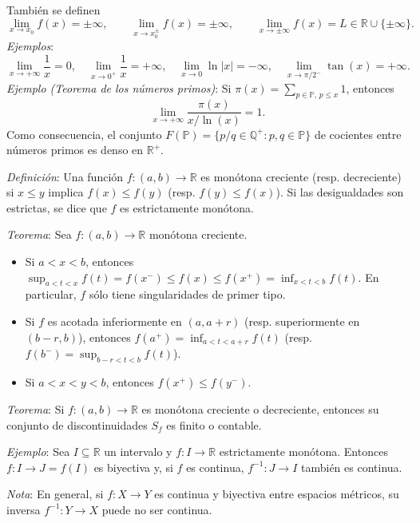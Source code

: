 \documentclass{beamer}
\begin{document}
  \begin{frame}
    También se definen
    \[
      \lim_{x \to x_0} f(x) = \pm\infty, \qquad \lim_{x \to x_0^{\pm}} f(x) = \pm\infty, 
      \qquad \lim_{x \to \pm\infty} f(x) = L \in \mathbb{R} \cup \{\pm\infty\}.
    \]
    \pause
    \textit{Ejemplos}:
    \[
      \lim_{x \to +\infty} \frac{1}{x} = 0, \quad \lim_{x \to 0^+} \frac{1}{x} = +\infty, 
      \quad \lim_{x \to 0} \ln|x| = -\infty, \quad \lim_{x \to \pi/2^-} \tan(x) = +\infty.
    \]
    \pause
    \textit{Ejemplo (Teorema de los números primos)}: Si 
    $\pi(x) = \sum_{p \in \mathbb{P}, \, p \leq x} 1$, entonces
    \[
      \lim_{x \to +\infty} \frac{\pi(x)}{x / \ln(x)} = 1.
    \]
    Como consecuencia, el conjunto $F(\mathbb{P}) = \{p/q \in \mathbb{Q}^+ : p, q \in \mathbb{P}\}$ 
    de cocientes entre números primos es denso en $\mathbb{R}^+$.
  \end{frame}

  \begin{frame}
    \textit{Definición}: Una función $f: (a, b) \to \mathbb{R}$ es monótona creciente 
    (resp. decreciente) si $x \leq y$ implica $f(x) \leq f(y)$ (resp. $f(y) \leq f(x)$). 
    Si las desigualdades son estrictas, se dice que $f$ es estrictamente monótona.
    \newline\newline
    \pause

    \textit{Teorema}: Sea $f: (a, b) \to \mathbb{R}$ monótona creciente.
    \pause
    \begin{itemize}[<+->]
      \item Si $a < x < b$, entonces
      $\displaystyle\sup_{a < t < x} f(t) = f(x^-) \leq f(x) \leq f(x^+) = \inf_{x < t < b} f(t)$. 
      En particular, $f$ sólo tiene singularidades de primer tipo.
      \item Si $f$ es acotada inferiormente en $(a, a + r)$ (resp. superiormente en 
      $(b - r, b)$), entonces $f(a^+) = \inf_{a < t < a + r} f(t)$ (resp. 
      $f(b^-) = \sup_{b - r < t < b} f(t)$).
      \item Si $a < x < y < b$, entonces $f(x^+) \leq f(y^-)$.
    \end{itemize}
  \end{frame}

  \begin{frame}
    \textit{Teorema}: Si $f: (a, b) \to \mathbb{R}$ es monótona creciente o decreciente, 
    entonces su conjunto de discontinuidades $S_f$ es finito o contable.
    \newline\newline
    \pause

    \textit{Ejemplo}: Sea $I \subseteq \mathbb{R}$ un intervalo y $f: I \to \mathbb{R}$ 
    estrictamente monótona. Entonces $f: I \to J = f(I)$ es biyectiva y, si $f$ es continua, 
    $f^{-1}: J \to I$ también es continua.
    \newline\newline
    \pause

    \textit{Nota}: En general, si $f: X \to Y$ es continua y biyectiva entre espacios 
    métricos, su inversa $f^{-1}: Y \to X$ puede no ser continua.
  \end{frame}
\end{document}

